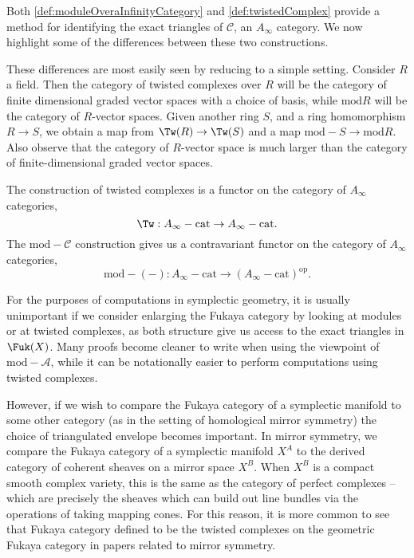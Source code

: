
Both \cref{def:moduleOveraInfinityCategory} and \cref{def:twistedComplex} provide a method for identifying the exact triangles of $\mathcal C$, an $A_\infty$ category. We now highlight some of the differences between these two constructions.

These differences are most easily seen by reducing to a simple setting. Consider $R$ a field. Then the category of twisted complexes over $R$ will be the category of finite dimensional graded vector spaces with a choice of basis, while $\text{mod} R$ will be the category of $R$-vector spaces. Given another ring $S$, and a ring homomorphism $R\to S$, we obtain a map from $\Tw(R)\to \Tw(S)$ and a map $\text{mod}-S\to \text{mod} R$. Also observe that the category of $R$-vector space is much larger than the category of finite-dimensional graded vector spaces.

The construction of twisted complexes is a functor on the category of $A_\infty$ categories,
\[\Tw:A_\infty-\text{cat}\to A_\infty-\text{cat}.\]
The $\text{mod}-\mathcal C$ construction gives us a contravariant functor on the category of $A_\infty$ categories,
\[\text{mod}-(-):A_\infty-\text{cat}\to (A_\infty-\text{cat})^{\text{op}}.\]

For the purposes of computations in symplectic geometry, it is usually unimportant if we consider enlarging the Fukaya category by looking at modules or at twisted complexes, as both structure give us access to the exact triangles in $\Fuk(X)$. Many proofs become cleaner to write when using the viewpoint of $\text{mod}-\mathcal A$, while it can be notationally easier to perform computations using twisted complexes. 

However, if we wish to compare the Fukaya category of a symplectic manifold to some other category (as in the setting of homological mirror symmetry) the choice of triangulated envelope becomes important. In mirror symmetry, we compare the Fukaya category of a symplectic manifold $X^A$ to the derived category of coherent sheaves on a mirror space $X^B$. When $X^B$ is a compact smooth complex variety, this is the same as the category of perfect complexes -- which are precisely the sheaves which can build out line bundles via the operations of taking mapping cones. For this reason, it is more common to see that Fukaya category defined to be the twisted complexes on the geometric Fukaya category in papers related to mirror symmetry.
